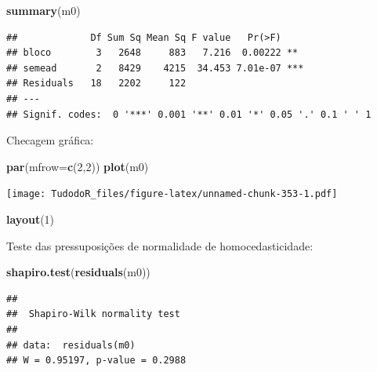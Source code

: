 \documentclass[
]{book}
\newenvironment{Shaded}{\begin{snugshade}}{\end{snugshade}}
\newcommand{\DataTypeTok}[1]{\textcolor[rgb]{0.13,0.29,0.53}{#1}}
\newcommand{\DecValTok}[1]{\textcolor[rgb]{0.00,0.00,0.81}{#1}}
\newcommand{\KeywordTok}[1]{\textcolor[rgb]{0.13,0.29,0.53}{\textbf{#1}}}
\newcommand{\NormalTok}[1]{#1}
\newcommand{\OperatorTok}[1]{\textcolor[rgb]{0.81,0.36,0.00}{\textbf{#1}}}
\begin{document}
\begin{Shaded}
\begin{Highlighting}[]
\KeywordTok{summary}\NormalTok{(m0)}
\end{Highlighting}
\end{Shaded}

\begin{verbatim}
##             Df Sum Sq Mean Sq F value   Pr(>F)    
## bloco        3   2648     883   7.216  0.00222 ** 
## semead       2   8429    4215  34.453 7.01e-07 ***
## Residuals   18   2202     122                     
## ---
## Signif. codes:  0 '***' 0.001 '**' 0.01 '*' 0.05 '.' 0.1 ' ' 1
\end{verbatim}

Checagem gráfica:

\begin{Shaded}
\begin{Highlighting}[]
\KeywordTok{par}\NormalTok{(}\DataTypeTok{mfrow=}\KeywordTok{c}\NormalTok{(}\DecValTok{2}\NormalTok{,}\DecValTok{2}\NormalTok{))}
\KeywordTok{plot}\NormalTok{(m0)}
\end{Highlighting}
\end{Shaded}

\texttt{[image: TudodoR\_files/figure-latex/unnamed-chunk-353-1.pdf]}

\begin{Shaded}
\begin{Highlighting}[]
\KeywordTok{layout}\NormalTok{(}\DecValTok{1}\NormalTok{)}
\end{Highlighting}
\end{Shaded}

Teste das pressuposições de normalidade de homocedasticidade:

\begin{Shaded}
\begin{Highlighting}[]
\KeywordTok{shapiro.test}\NormalTok{(}\KeywordTok{residuals}\NormalTok{(m0))}
\end{Highlighting}
\end{Shaded}

\begin{verbatim}
## 
##  Shapiro-Wilk normality test
## 
## data:  residuals(m0)
## W = 0.95197, p-value = 0.2988
\end{verbatim}

\begin{Shaded}
\end{Shaded}
\end{document}
